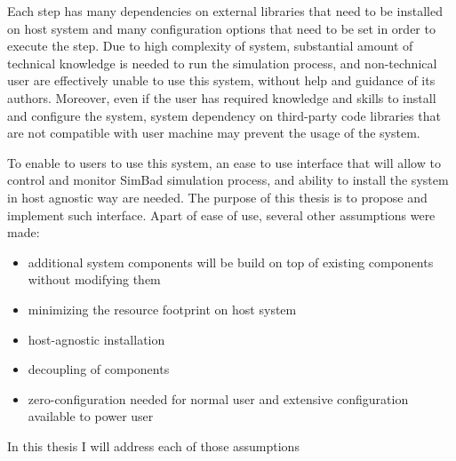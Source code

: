Each step has many dependencies on external libraries that need to be installed on host system and many configuration options that need to be set in order to execute the step. Due to high complexity of system, substantial amount of technical knowledge is needed to run the simulation process, and non-technical user are effectively unable to use this system, without help and guidance of its authors. Moreover, even if the user has required knowledge and skills to install and configure the system, system dependency on third-party code libraries that are not compatible with user machine may prevent the usage of the system.

To enable to users to use this system, an ease to use interface that will allow to control and monitor SimBad simulation process, and ability to install the system in host agnostic way are needed. The purpose of this thesis is to propose and implement such interface. 
Apart of ease of use, several other assumptions were made:
\begin{itemize}
    \item additional system components will be build on top of existing components without modifying them
    \item minimizing the resource footprint on host system
    \item host-agnostic installation
    \item decoupling of components
    \item zero-configuration needed for normal user and extensive configuration available to power user
\end{itemize}
In this thesis I will address each of those assumptions